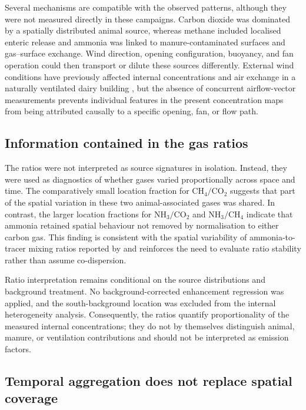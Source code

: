 \documentclass[12pt,a4paper]{article}
\begin{document}
Several mechanisms are compatible with the observed patterns, although they
were not measured directly in these campaigns. Carbon dioxide was dominated
by a spatially distributed animal source, whereas methane included localised
enteric release and ammonia was linked to manure-contaminated surfaces and
gas--surface exchange. Wind direction, opening configuration, buoyancy, and
fan operation could then transport or dilute these sources differently.
External wind conditions have previously affected internal concentrations and
air exchange in a naturally ventilated dairy building \citep{Saha2013}, but
the absence of concurrent airflow-vector measurements prevents individual
features in the present concentration maps from being attributed causally to
a specific opening, fan, or flow path.

\subsection{Information contained in the gas ratios}

The ratios were not interpreted as source signatures in isolation. Instead,
they were used as diagnostics of whether gases varied proportionally across
space and time. The comparatively small location fraction for
\(\mathrm{CH_4}/\mathrm{CO_2}\) suggests that part of the spatial variation
in these two animal-associated gases was shared. In contrast, the larger
location fractions for \(\mathrm{NH_3}/\mathrm{CO_2}\) and
\(\mathrm{NH_3}/\mathrm{CH_4}\) indicate that ammonia retained spatial
behaviour not removed by normalisation to either carbon gas. This finding is
consistent with the spatial variability of ammonia-to-tracer mixing ratios
reported by \citet{Mendes2015} and reinforces the need to evaluate ratio
stability rather than assume co-dispersion.

Ratio interpretation remains conditional on the source distributions and
background treatment. No background-corrected enhancement regression was
applied, and the south-background location was excluded from the internal
heterogeneity analysis. Consequently, the ratios quantify proportionality of
the measured internal concentrations; they do not by themselves distinguish
animal, manure, or ventilation contributions and should not be interpreted as
emission factors.

\subsection{Temporal aggregation does not replace spatial coverage}
\end{document}
